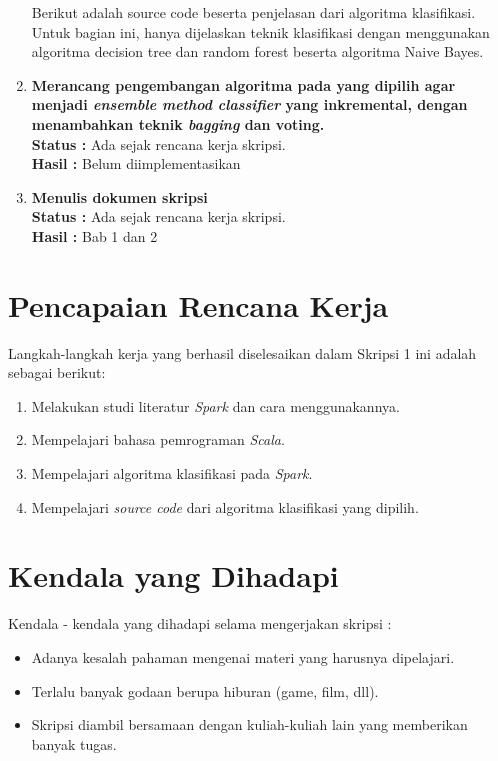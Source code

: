 \documentclass[a4paper,twoside]{article}
\begin{document}
\begin{enumerate}
Berikut adalah source code beserta penjelasan dari algoritma klasifikasi. Untuk bagian ini, hanya dijelaskan teknik klasifikasi dengan menggunakan algoritma decision tree dan random forest beserta algoritma Naive Bayes.

		\item \textbf{Merancang pengembangan algoritma pada yang dipilih agar menjadi \textit{ensemble method classifier} yang inkremental, dengan menambahkan teknik \textit{bagging} dan voting.
}\\
		{\bf Status :} Ada sejak rencana kerja skripsi.\\
		{\bf Hasil :} Belum diimplementasikan

		\item \textbf{Menulis dokumen skripsi}\\
		{\bf Status :} Ada sejak rencana kerja skripsi.\\
		{\bf Hasil :} Bab 1 dan 2
	\end{enumerate}


\section{Pencapaian Rencana Kerja}
Langkah-langkah kerja yang berhasil diselesaikan dalam Skripsi 1 ini adalah sebagai berikut:
\begin{enumerate}
\item Melakukan studi literatur \textit{Spark} dan cara menggunakannya.
\item Mempelajari bahasa pemrograman \textit{Scala}.
\item Mempelajari algoritma klasifikasi pada \textit{Spark}.
\item Mempelajari \textit{source code} dari algoritma klasifikasi yang dipilih.
\end{enumerate}



\section{Kendala yang Dihadapi}
Kendala - kendala yang dihadapi selama mengerjakan skripsi :
\begin{itemize}
	\item Adanya kesalah pahaman mengenai materi yang harusnya dipelajari.
	\item Terlalu banyak godaan berupa hiburan (game, film, dll).
	\item Skripsi diambil bersamaan dengan kuliah-kuliah lain yang memberikan banyak tugas.
\end{itemize}
\end{document}

